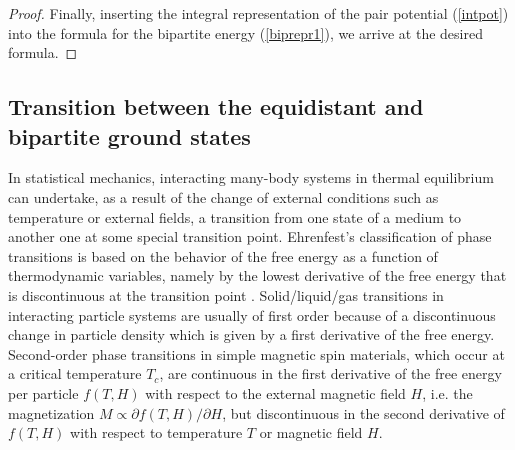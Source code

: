 \documentclass[12pt]{iopart}
\theoremstyle{definition}
\begin{document}
\begin{proof}
Finally, inserting the integral representation of the pair potential
(\ref{intpot}) into the formula for the bipartite energy (\ref{biprepr1}),
we arrive at the desired formula.
\end{proof}

\subsection{Transition between the equidistant and bipartite ground states}
\label{Sec23}
In statistical mechanics, interacting many-body systems in thermal
equilibrium can undertake, as a result of the change of external conditions
such as temperature or external fields, a transition from one state of
a medium to another one at some special transition point.
Ehrenfest's classification of phase transitions is based on the behavior
of the free energy as a function of thermodynamic variables, namely by
the lowest derivative of the free energy that is discontinuous at
the transition point \cite{Jaeger98}.
Solid/liquid/gas transitions in interacting particle systems are usually
of first order because of a discontinuous change in particle density
which is given by a first derivative of the free energy.
Second-order phase transitions in simple magnetic spin materials, which occur
at a critical temperature $T_c$, are continuous in the first derivative of
the free energy per particle $f(T,H)$ with respect to the external magnetic
field $H$, i.e. the magnetization $M\propto \partial f(T,H)/\partial H$,
but discontinuous in the second derivative of $f(T,H)$ with respect to
temperature $T$ or magnetic field $H$.
\end{document}
